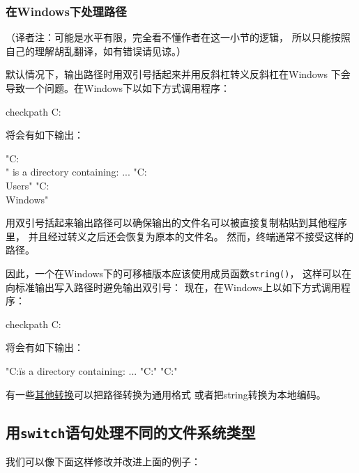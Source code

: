 \subsubsection{在Windows下处理路径}\label{ch20.1.1.1}
（译者注：可能是水平有限，完全看不懂作者在这一小节的逻辑，
所以只能按照自己的理解胡乱翻译，如有错误请见谅。）

默认情况下，输出路径时用双引号括起来并用反斜杠转义反斜杠在Windows
下会导致一个问题。在Windows下以如下方式调用程序：
\begin{blacklisting}
    checkpath C:\
\end{blacklisting}
将会有如下输出：
\begin{blacklisting}
    "C:\\" is a directory containing:
    ...
    "C:\\Users"
    "C:\\Windows"
\end{blacklisting}
用双引号括起来输出路径可以确保输出的文件名可以被直接复制粘贴到其他程序里，
并且经过转义之后还会恢复为原本的文件名。
然而，终端通常不接受这样的路径。

因此，一个在Windows下的可移植版本应该使用成员函数\texttt{string()}，
这样可以在向标准输出写入路径时避免输出双引号：
现在，在Windows上以如下方式调用程序：
\begin{blacklisting}
    checkpath C:\
\end{blacklisting}
将会有如下输出：
\begin{blacklisting}
    "C:\" is a directory containing:
    ...
    "C:\Users"
    "C:\Windows"
\end{blacklisting}
有一些\hyperref[ch20.3.4]{其他转换}可以把路径转换为通用格式
或者把string转换为本地编码。

\subsection{用\texttt{switch}语句处理不同的文件系统类型}
我们可以像下面这样修改并改进上面的例子：

